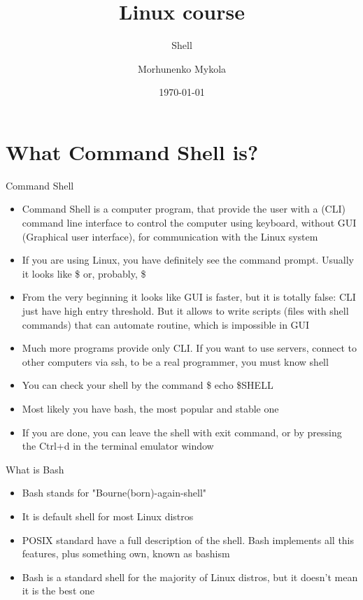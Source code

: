 \documentclass[usenames,dvipsnames,10pt,aspectratio=169]{beamer}
\title{Linux course}
\subtitle{Shell}
\date[\today]{\small\today}
\author[Morhunenko Mykola]{Morhunenko Mykola}
\institute{APPS@UCU}
\begin{document}
\begin{frame}
\titlepage
\end{frame}

\begin{frame}{\contentsname}
\tableofcontents
\end{frame}

\section{What Command Shell is?}

\begin{frame}{Command Shell}
\begin{itemize}
    \item Command Shell is a computer program, that provide the user with a (CLI) command line interface to control the computer using keyboard, without GUI (Graphical user interface), for communication with the Linux system
    \item If you are using Linux, you have definitely see the command prompt. Usually it looks like {\color{ucugreen}\$} or, probably, {\color{ucugreen} \$}
    \item From the very beginning it looks like GUI is faster, but it is totally false: CLI just have high entry threshold. But it allows to write scripts (files with shell commands) that can automate routine, which is impossible in GUI
    \item Much more programs provide only CLI. If you want to use servers, connect to other computers via ssh, to be a real programmer, you must know shell
    \item You can check your shell by the command {\color{ucugreen} \$ echo \$SHELL}
    \item Most likely you have {\color{ucugreen} bash}, the most popular and stable one
    \item If you are done, you can leave the shell with {\color{ucugreen} exit} command, or by pressing the {\color{ucugreen}Ctrl+d} in the terminal emulator window
\end{itemize}
\end{frame}

\begin{frame}{What is Bash}
\begin{itemize}
    \item Bash stands for "Bourne(born)-again-shell"
    \item It is default shell for most Linux distros
    \item POSIX standard have a full description of the shell. Bash implements all this features, plus something own, known as {\color{ucugreen} bashism}
    \item Bash is a standard shell for the majority of  Linux distros, but it doesn't mean it is the best one
\end{itemize}
\end{frame}
\end{document}

